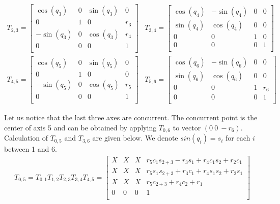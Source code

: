 \documentclass{article}
\begin{document}
\[
\begin{array}{cc}
T_{2,3} =
\begin{bmatrix}
  \cos(q_3) & 0 & \sin(q_3) & 0 \\
  0 & 1 & 0 & r_3 \\
  -\sin(q_3) & 0 & \cos(q_3) & r_4 \\
  0 & 0 & 0 & 1 \\

\end{bmatrix}
&
T_{3,4} =
\begin{bmatrix}
  \cos(q_4) & -\sin(q_4) & 0 & 0 \\
  \sin(q_4) & \cos(q_4) & 0 & 0 \\
  0 & 0 & 1 & 0 \\
  0 & 0 & 0 & 1 \\

\end{bmatrix}
\end{array}
\]
\[
\begin{array}{cc}
T_{4,5} =
\begin{bmatrix}
  \cos(q_5) & 0 & \sin(q_5) & 0 \\
  0 & 1 & 0 & 0 \\
  -\sin(q_5) & 0 & \cos(q_5) & r_5 \\
  0 & 0 & 0 & 1 \\

\end{bmatrix}

&

T_{5,6} =
\begin{bmatrix}
  \cos(q_6) & -\sin(q_6) & 0 & 0 \\
  \sin(q_6) & \cos(q_6) & 0 & 0\\
  0 & 0 & 1 & r_6\\
  0 & 0 & 0 & 1\\

\end{bmatrix}
\end{array}
\]

Let us notice that the last three axes are concurrent. The concurrent point is the center of axis 5 and can be obtained by applying $T_{0,6}$ to vector $\left(0\ 0\ -r_6\right)$.
Calculation of  $T_{0,5}$ and $T_{3,6}$ are given below. We denote $sin(q_i)=s_i$  for each $i$ between 1 and 6.
\begin{align*}
T_{0,5} = T_{0,1} T_{1,2} T_{2,3} T_{3,4} T_{4,5} =
\begin{bmatrix}
  X & X & X &r_5c_1s_{2+3}-r_3s_1+r_4c_1s_2+r_2c_1\\
  X & X & X & r_5s_1s_{2+3}+r_3c_1+r_4s_1s_2+r_2s_1 \\
  X & X & X & r_5c_{2+3}+r_4c_2+r_1 \\
  0 & 0 & 0 & 1 \\
\end{bmatrix}
\end{align*}
\end{document}

